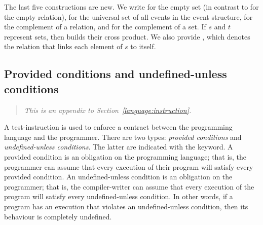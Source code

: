 \begin{syntax}
 \is{} 
\alt {}
\alt {}\T{*} \orelse {}\T{+}  \orelse {}
\alt {}\T{|} \orelse
{}\T{;} \orelse
{}\T{\textbackslash} \orelse
{}\T{\&}
\alt {}\T{(}\T{)}
\alt {} \T{(}  \T{)}
\alt {} \T{(}  \T{)} \T{->} 
\alt {}  \brepet{}   \erepet{}  
\alt {}   \brepet{}   \erepet{}  
\alt \T{(}\T{)}
\alt \T{\{\}}
\alt \T{\_}
\alt \T{\textasciitilde} 
\alt \T{!} 
\alt {} \T{*} 
\alt \T{[}  \T{]}
\end{syntax}

The last five constructions are new. We write \synt{\T{\{\}}} for the empty set (in contrast to  for the empty relation), \synt{\T{\_}} for the universal set of all events in the event structure, \synt{\T{\textasciitilde}} for the complement of a relation, and \synt{\T{!}} for the complement of a set. If $s$ and $t$ represent sets, then  builds their cross product. We also provide \synt{\T{[} \text{$s$} \T{]}}, which denotes the relation that links each element of $s$ to itself.

\subsection{Provided conditions and undefined-unless conditions}

\begin{quote}\it
This is an appendix to Section~\ref{language:instruction}.
\end{quote}

A test-instruction is used to enforce a contract between the programming language and the programmer. There are two types: \emph{provided conditions} and \emph{undefined-unless conditions}. The latter are indicated with the  keyword. A provided condition is an obligation on the programming language; that is, the programmer can assume that every execution of their program will satisfy every provided condition. An undefined-unless condition is an obligation on the programmer; that is, the compiler-writer can assume that every execution of the program will satisfy every undefined-unless condition. In other words, if a program has an execution that violates an undefined-unless condition, then its behaviour is completely undefined.

